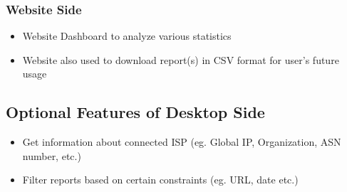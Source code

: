 \documentclass[12pt]{article}
\begin{document}
\subsubsection{Website Side}
\begin{itemize}
   \item Website Dashboard to analyze various statistics
    \item Website also used to download report(s) in CSV format for user's future usage
\end{itemize}

\subsection{Optional Features of Desktop Side}
\begin{itemize}
  \item Get information about connected ISP (eg. Global IP, Organization, ASN number, etc.)
  \item Filter reports based on certain constraints (eg. URL, date etc.) 
\end{itemize}

\end{document}
